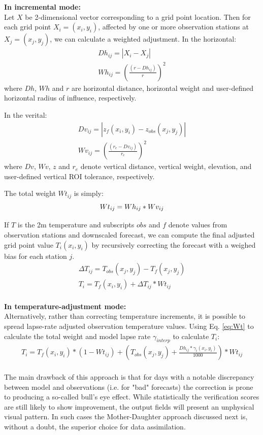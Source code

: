 \documentclass{article}
\begin{document}
\noindent\textbf{In incremental mode:}\\
Let $X$ be 2-dimensional vector corresponding to a grid point location. Then for each grid point $X_i = (x_i,y_i)$, affected by one or more observation stations at $X_j = (x_j,y_j)$, we can calculate a weighted adjustment. In the horizontal:
\begin{eqnarray}
Dh_{ij} = | X_{i} - X_{j} | \nonumber\\ 
Wh_{ij} = (\frac{(r - Dh_{ij})}{r})^2 \nonumber
\end{eqnarray}
where $Dh$, $Wh$ and $r$ are horizontal distance, horizontal weight and user-defined horizontal radius of influence, respectively. 

In the verital:
\begin{eqnarray}
Dv_{ij} = | z_{f}(x_i,y_i) - z_{obs}(x_j,y_j) | \nonumber\\
Wv_{ij} = (\frac{(r_e - Dv_{ij})}{r_e})^2 \nonumber
\end{eqnarray}
where $Dv$, $Wv$, $z$ and $r_e$ denote vertical distance, vertical weight, elevation, and user-defined vertical ROI tolerance, respectively. 

The total weight $Wt_{ij}$ is simply:
\begin{equation}\label{eq:Wt}
Wt_{ij} = Wh_{ij} * Wv_{ij}\\
\end{equation}

If $T$ is the 2m temperature and subscripts $obs$ and $f$ denote values from observation stations and downscaled forecast, we can compute the final adjusted grid point value $T_i(x_i,y_i)$ by recursively correcting the forecast with a weighed bias for each station $j$.
\begin{eqnarray}
\Delta T_{ij} = T_{obs}(x_j,y_j) - T_{f}(x_j,y_j) \nonumber\\ 
T_i = T_f(x_i,y_i) + \Delta T_{ij} * Wt_{ij}
\end{eqnarray}
\\

\noindent\textbf{In temperature-adjustment mode:}\\
Alternatively, rather than correcting temperature increments, it is possible to spread lapse-rate adjusted observation temperature values. Using Eq. \ref{eq:Wt} to calculate the total weight and model lapse rate $\gamma_{interp}$ to calculate $T_i$:
\begin{eqnarray}
T_i = T_f(x_i,y_i) * (1-Wt_{ij}) + (T_{obs}(x_j,y_j)+ \frac{Dh_{ij}*\gamma_{i}(x_i,y_i)}{1000})*Wt_{ij}
\end{eqnarray}
\\
The main drawback of this approach is that for days with a notable discrepancy between model and observations (i.e. for "bad" forecasts) the correction is prone to producing a so-called bull's eye effect. While statistically the verification scores are still likely to show improvement, the output fields will present an unphysical visual pattern. In such cases the Mother-Daughter approach discussed next is, without a doubt, the superior choice for data assimilation.
\end{document}
